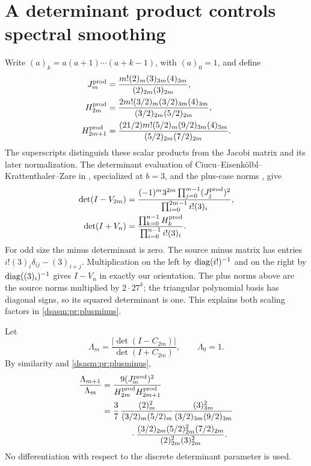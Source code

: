 \documentclass[11pt,letterpaper]{article}
\theoremstyle{remark}\newtheorem{remark}[theorem]{Remark}
\begin{document}
\section{A determinant product controls spectral smoothing}
\label{dsasm:pr:sec:smoothing}
Write $(a)_k=a(a+1)\cdots(a+k-1)$, with $(a)_0=1$, and define
\begin{equation}\label{dsasm:pr:norms}
\begin{split}
 J_m^{\rm prod}&=\frac{m!(2)_m(3)_{3m}(4)_{3m}}{(2)_{2m}(3)_{2m}},\\
 H_{2m}^{\rm prod}&=\frac{2m!(3/2)_m(3/2)_{3m}(4)_{3m}}
                         {(3/2)_{2m}(5/2)_{2m}},\\
 H_{2m+1}^{\rm prod}&=\frac{(21/2)m!(5/2)_m(9/2)_{3m}(4)_{3m}}
                           {(5/2)_{2m}(7/2)_{2m}}.
\end{split}
\end{equation}
The superscripts distinguish these scalar products from the Jacobi
matrix and its later normalization. The determinant evaluation of Ciucu--Eisenk\"olbl--Krattenthaler--Zare
in \cite[Theorem 4.4]{ros}, specialized at $b=3$, and the plus-case norms
\cite[(3.5b,d) and Theorem 3.1]{ros}, give
\begin{equation}\label{dsasm:pr:plusminus}
\begin{split}
 \det(I-V_{2m})&=
 \frac{(-1)^m3^{2m}\prod_{j=0}^{m-1}(J_j^{\rm prod})^2}
      {\prod_{i=0}^{2m-1}i!(3)_i},\\
 \det(I+V_n)&=
 \frac{\prod_{k=0}^{n-1}H_k^{\rm prod}}{\prod_{i=0}^{n-1}i!(3)_i}.
\end{split}
\end{equation}
For odd size the minus determinant is zero. The source minus matrix
has entries $i!(3)_i\delta_{ij}-(3)_{i+j}$. Multiplication on the left
by $\operatorname{diag}(i!)^{-1}$ and on the right by $\operatorname{diag}((3)_i)^{-1}$ gives
$I-V_n$ in exactly our orientation. The plus norms above are the
source norms multiplied by $2\cdot27^k$; the triangular polynomial
basis has diagonal signs, so its squared determinant is one.
This explains both scaling factors in \eqref{dsasm:pr:plusminus}.

Let
\[
 \Lambda_m=\frac{|\det(I-C_{2m})|}{\det(I+C_{2m})},\qquad \Lambda_0=1.
\]
By similarity and \eqref{dsasm:pr:plusminus},
\begin{equation}\label{dsasm:pr:lambdaratio}
\begin{split}
\frac{\Lambda_{m+1}}{\Lambda_m}
 &=\frac{9(J_m^{\rm prod})^2}{H_{2m}^{\rm prod}H_{2m+1}^{\rm prod}}\\
 &=\frac37\,
 \frac{(2)_m^2}{(3/2)_m(5/2)_m}
 \frac{(3)_{3m}^2}{(3/2)_{3m}(9/2)_{3m}}\\
 &\hspace{12mm}\cdot
 \frac{(3/2)_{2m}(5/2)_{2m}^2(7/2)_{2m}}
 {(2)_{2m}^2(3)_{2m}^2}.
\end{split}
\end{equation}
No differentiation with respect to the discrete determinant parameter
is used.
\end{document}
